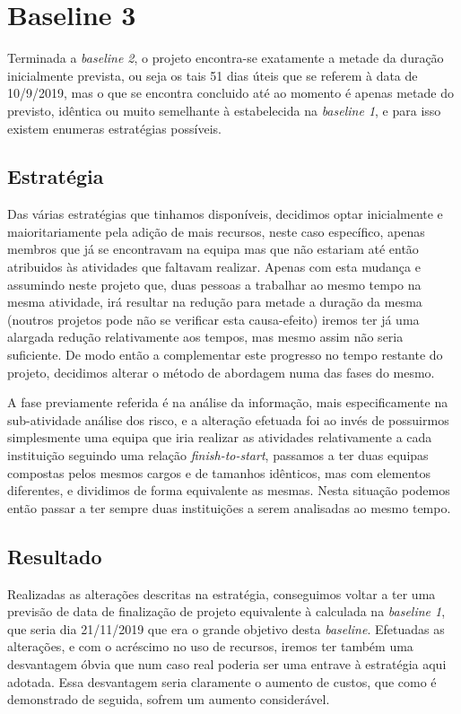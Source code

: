 \section{Baseline 3}
Terminada a \textit{baseline 2}, o projeto encontra-se exatamente a metade da duração inicialmente prevista, ou seja os tais 51 dias úteis que se referem à data de 10/9/2019, mas o que se encontra concluido até ao momento é apenas metade do previsto, idêntica ou muito semelhante à estabelecida na \textit{baseline 1}, e para isso existem enumeras estratégias possíveis.
\subsection{Estratégia}
Das várias estratégias que tinhamos disponíveis, decidimos optar inicialmente e maioritariamente pela adição de mais recursos, neste caso específico, apenas membros que já se encontravam na equipa mas que não estariam até então atribuidos às atividades que faltavam realizar. Apenas com esta mudança e assumindo neste projeto que, duas pessoas a trabalhar ao mesmo tempo na mesma atividade, irá resultar na redução para metade a duração da mesma (noutros projetos pode não se verificar esta causa-efeito) iremos ter já uma alargada redução relativamente aos tempos, mas mesmo assim não seria suficiente. De modo então a complementar este progresso no tempo restante do projeto, decidimos alterar o método de abordagem numa das fases do mesmo.

A fase previamente referida é na análise da informação, mais especificamente na sub-atividade análise dos risco, e a alteração efetuada foi ao invés de possuirmos simplesmente uma equipa que iria realizar as atividades relativamente a cada instituição seguindo uma relação \textit{finish-to-start}, passamos a ter duas equipas compostas pelos mesmos cargos e de tamanhos idênticos, mas com elementos diferentes, e dividimos de forma equivalente as mesmas. Nesta situação podemos então passar a ter sempre duas instituições a serem analisadas ao mesmo tempo.

\subsection{Resultado}
Realizadas as alterações descritas na estratégia, conseguimos voltar a ter uma previsão de data de finalização de projeto equivalente à calculada na \textit{baseline 1}, que seria dia 21/11/2019 que era o grande objetivo desta \textit{baseline}.
Efetuadas as alterações, e com o acréscimo no uso de recursos, iremos ter também uma desvantagem óbvia que num caso real poderia ser uma entrave à estratégia aqui adotada. Essa desvantagem seria claramente o aumento de custos, que como é demonstrado de seguida, sofrem um aumento considerável.